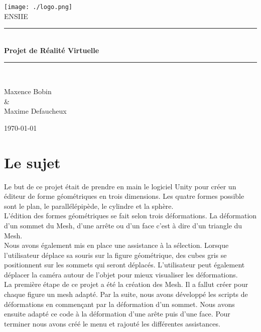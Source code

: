 \documentclass[a4paper,oneside,12pt,titlepage]{article}
\newcommand{\HRule}{\rule{\linewidth}{0.5mm}}
\begin{document}
\begin{titlepage}
\begin{center}
 
\texttt{[image: ./logo.png]}\\[1cm]
 
\textsc{\Large ENSIIE}\\[0.5cm]
 
 
\HRule \\[0.4cm]
{ \huge \bfseries
Projet de Réalité Virtuelle}\\[0.4cm]
 
\HRule \\[1.5cm]
 
\begin{center}
\large Maxence Bobin \\
\& \\
\large Maxime Defaucheux
\end{center}
 
\vfill
{\large \today}
 
\end{center}
\end{titlepage}

\clearpage
\tableofcontents
\clearpage

\section{Le sujet}

Le but de ce projet était de prendre en main le logiciel Unity pour créer un éditeur de forme géométriques en trois dimensions. Les quatre formes possible sont le plan, le parallélépipède, le cylindre et la sphère.\\
L'édition des formes géométriques se fait selon trois déformations. La déformation d'un sommet du Mesh, d'une arrête ou d'un face c'est à dire d'un triangle du Mesh.
\\Nous avons également mis en place une assistance à la sélection. Lorsque l'utilisateur déplace sa souris sur la figure géométrique, des cubes gris se positionnent sur les sommets qui seront déplacés. L'utilisateur peut également déplacer la caméra autour de l'objet pour mieux visualiser les déformations.\\

La première étape de ce projet a été la création des Mesh. Il a fallut créer pour chaque figure un mesh adapté.
Par la suite, nous avons développé les scripts de déformations en commençant par la déformation d'un sommet. Nous avons ensuite adapté ce code à la déformation d'une arête puis d'une face. Pour terminer nous avons créé le menu et rajouté les différentes assistances.
\end{document}
